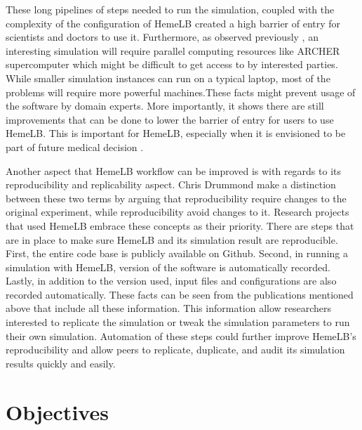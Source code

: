 These long pipelines of steps needed to run the simulation, coupled with the complexity of the configuration of HemeLB created a high barrier of entry for scientists and doctors to use it. Furthermore, as observed previously \citep{Steven:2016aa}, an interesting simulation will require parallel computing resources like ARCHER supercomputer which might be difficult to get access to by interested parties. While smaller simulation instances can run on a typical laptop, most of the problems will require more powerful machines.These facts might prevent usage of the software by domain experts. More importantly, it shows there are still improvements that can be done to lower the barrier of entry for users to use HemeLB. This is important for HemeLB, especially when it is envisioned to be part of future medical decision \citep{1_green_2014}.

Another aspect that HemeLB workflow can be improved is with regards to its reproducibility and replicability aspect. Chris Drummond \citep{drummond2009replicability} make a distinction between these two terms by arguing that reproducibility require changes to the original experiment, while reproducibility avoid changes to it. Research projects that used HemeLB embrace these concepts as their priority. There are steps that are in place to make sure HemeLB and its simulation result are reproducible. First, the entire code base is publicly available on Github. Second, in running a simulation with HemeLB, version of the software is automatically recorded. Lastly, in addition to the version used, input files and configurations are also recorded automatically. These facts can be seen from the publications mentioned above \citep{bernabeu2015characterization,itani2015automated,franco2015dynamic,franco2016non} that include all these information. This information allow researchers interested to replicate the simulation or tweak the simulation parameters to run their own simulation. Automation of these steps could further improve HemeLB's reproducibility and allow peers to replicate, duplicate, and audit its simulation results quickly and easily. 


\section{Objectives}

